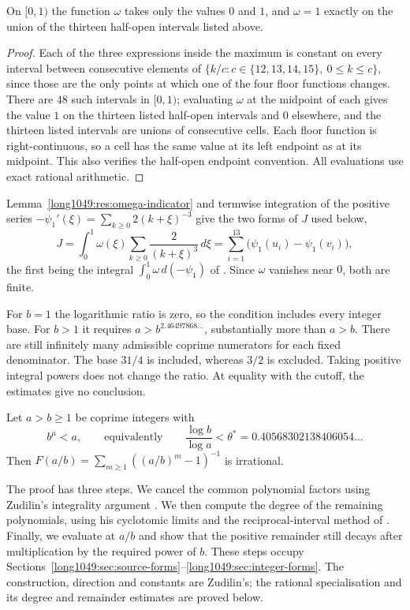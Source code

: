 \begin{lemma}\label{long1049:res:omega-indicator}
On $[0,1)$ the function $\omega$ takes only the values $0$ and $1$, and
$\omega=1$ exactly on the union of the thirteen half-open intervals listed above.
\end{lemma}

\begin{proof}
Each of the three expressions inside the maximum is constant on every interval
between consecutive elements of
$\{k/c: c\in\{12,13,14,15\},\ 0\le k\le c\}$, since those are the only points at
which one of the four floor functions changes.  There are $48$ such intervals in
$[0,1)$; evaluating $\omega$ at the midpoint of each gives the value $1$ on the
thirteen listed half-open intervals and $0$ elsewhere, and the thirteen listed
intervals are unions of consecutive cells. Each floor function is
right-continuous, so a cell has the same value at its left endpoint as
at its midpoint. This also verifies the half-open endpoint convention.
All evaluations use exact rational arithmetic.
\end{proof}

\noindent Lemma~\ref{long1049:res:omega-indicator} and termwise integration of the positive series
$-\psi_1'(\xi)=\sum_{k\ge0}2(k+\xi)^{-3}$ give the two forms of $J$ used below,
\[
 J=\int_0^1\omega(\xi)\sum_{k\ge0}\frac{2}{(k+\xi)^{3}}\,d\xi
  =\sum_{i=1}^{13}\bigl(\psi_1(u_i)-\psi_1(v_i)\bigr),
\]
the first being the integral $\int_0^1\omega\,d(-\psi_1)$ of
\cite[Lemma~2, p.~155, and (26), p.~162]{zudilin2004}.  Since $\omega$ vanishes
near $0$, both are finite.

For $b=1$ the logarithmic ratio is zero, so the condition includes every
integer base. For $b>1$ it requires $a>b^{2.46497868\ldots}$, substantially
more than $a>b$. There are still infinitely many admissible coprime
numerators for each fixed denominator. The base $31/4$ is included,
whereas $3/2$ is excluded. Taking positive integral powers does not
change the ratio. At equality with the cutoff, the estimates give no
conclusion.

\begin{theorem}\label{long1049:res:region}
Let $a>b\ge1$ be coprime integers with
\[
 b^{\mu}<a,
 \qquad\text{equivalently}\qquad
 \frac{\log b}{\log a}<\theta^{*}=0.40568302138406054\ldots
\]
Then $F(a/b)=\sum_{m\ge1}(( a/b)^{m}-1)^{-1}$ is irrational.
\end{theorem}

The proof has three steps. We cancel the common polynomial factors
using Zudilin's integrality argument \cite[pp.~156--161]{zudilin2004}.
We then compute the degree of the remaining polynomials, using his
cyclotomic limits and the reciprocal-interval method of
\cite[Lemma~1, p.~466]{zudilin2002}. Finally, we evaluate at $a/b$
and show that the positive remainder still decays after multiplication
by the required power of $b$. These steps occupy
Sections~\ref{long1049:sec:source-forms}--\ref{long1049:sec:integer-forms}.
The construction, direction and constants are Zudilin's; the rational
specialisation and its degree and remainder estimates are proved below.

